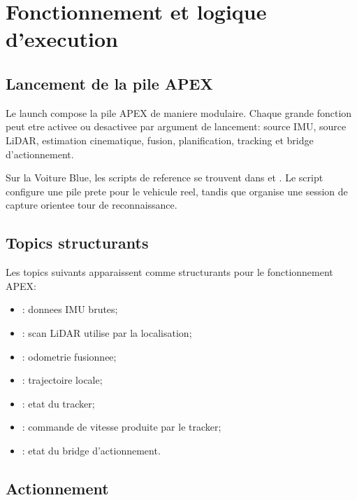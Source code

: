 \section{Fonctionnement et logique d'execution}

\subsection{Lancement de la pile APEX}

Le launch  compose la pile APEX de maniere modulaire. Chaque grande fonction peut etre activee ou desactivee par argument de lancement: source IMU, source LiDAR, estimation cinematique, fusion, planification, tracking et bridge d'actionnement.

Sur la Voiture Blue, les scripts de reference se trouvent dans  et . Le script  configure une pile prete pour le vehicule reel, tandis que  organise une session de capture orientee tour de reconnaissance.

\subsection{Topics structurants}

Les topics suivants apparaissent comme structurants pour le fonctionnement APEX:

\begin{itemize}
  \item {}: donnees IMU brutes;
  \item {}: scan LiDAR utilise par la localisation;
  \item {}: odometrie fusionnee;
  \item {}: trajectoire locale;
  \item {}: etat du tracker;
  \item {}: commande de vitesse produite par le tracker;
  \item {}: etat du bridge d'actionnement.
\end{itemize}

\subsection{Actionnement}

